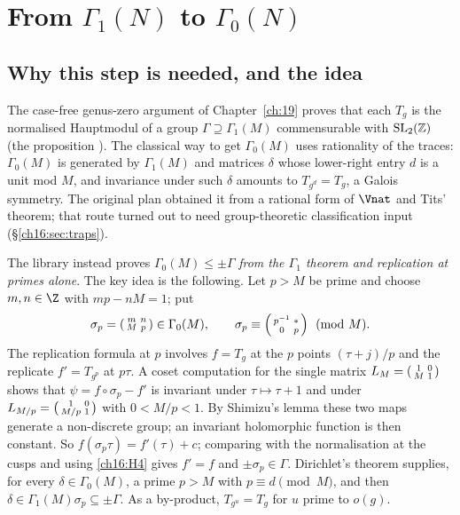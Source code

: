 \section{From \texorpdfstring{$\Gamma_1(N)$}{Gamma1(N)} to \texorpdfstring{$\Gamma_0(N)$}{Gamma0(N)}}\label{ch16:sec:gammazero}

\subsection{Why this step is needed, and the idea}

The case-free genus-zero argument of Chapter~\ref{ch:19} proves that each $T_g$ is the normalised Hauptmodul of a group
$\Gamma\supseteq\Gamma_1(M)$ commensurable with $\mathrm{SL}_2(\mathbb{Z})$ (the proposition ).  The
classical way to get $\Gamma_0(M)$ uses rationality of the traces: $\Gamma_0(M)$ is generated by $\Gamma_1(M)$ and
matrices $\delta$ whose lower-right entry $d$ is a unit mod $M$, and invariance under such $\delta$ amounts to
$T_{g^d}=T_g$, a Galois symmetry.  The original plan obtained it from
a rational form of $\Vnat$ and Tits' theorem; that route turned out to need group-theoretic classification input
(\S\ref{ch16:sec:traps}).

The library instead proves $\Gamma_0(M)\le\pm\Gamma$ \emph{from the $\Gamma_1$ theorem and replication at primes
alone}.  The key idea is the following.  Let $p>M$ be prime and choose
$m,n\in\Z$ with $mp-nM=1$; put
\begin{equation*}
  \sigma_p=\left(\begin{smallmatrix}m&n\\M&p\end{smallmatrix}\right)\in\Gamma_0(M),\qquad \sigma_p\equiv\left(\begin{smallmatrix}p^{-1}&*\\0&p\end{smallmatrix}\right)\pmod M .
\end{equation*}
The replication formula at $p$ involves $f=T_g$ at the $p$ points $(\tau+j)/p$ and the replicate $f'=T_{g^p}$ at
$p\tau$.  A coset computation for the single matrix $L_M=\left(\begin{smallmatrix}1&0\\M&1\end{smallmatrix}\right)$ shows that $\psi=f\circ\sigma_p-f'$ is
invariant under $\tau\mapsto\tau+1$ and under $L_{M/p}=\left(\begin{smallmatrix}1&0\\M/p&1\end{smallmatrix}\right)$ with $0<M/p<1$.  By Shimizu's lemma these
two maps generate a non-discrete group; an invariant holomorphic function is then constant.  So
$f(\sigma_p\tau)=f'(\tau)+c$; comparing with the normalisation at the cusps and using \ref{ch16:H4} gives $f'=f$ and
$\pm\sigma_p\in\Gamma$.  Dirichlet's theorem supplies, for every $\delta\in\Gamma_0(M)$, a prime $p>M$ with
$p\equiv d\pmod M$, and then $\delta\in\Gamma_1(M)\sigma_p\subseteq\pm\Gamma$.  As a by-product, $T_{g^u}=T_g$ for $u$
prime to $o(g)$.

